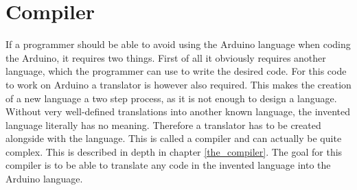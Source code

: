 \section{Compiler}
If a programmer should be able to avoid using the Arduino language when coding the Arduino, it requires two things. First of all it obviously requires another language, which the programmer can use to write the desired code. For this code to work on Arduino a translator is however also required. This makes the creation of a new language a two step process, as it is not enough to design a language. Without very well-defined translations into another known language, the invented language literally has no meaning. Therefore a translator has to be created alongside with the language. This is called a compiler and can actually be quite complex. This is described in depth in chapter \ref{the_compiler}. The goal for this compiler is to be able to translate any code in the invented language into the Arduino language.